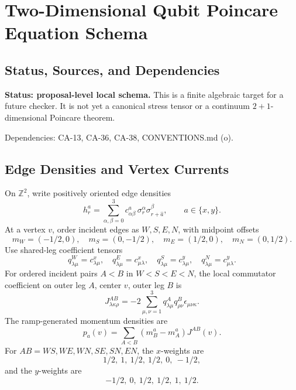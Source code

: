 
\section{Two-Dimensional Qubit Poincare Equation Schema}
\label{sec:qubit-2d-poincare-equation-schema}

\subsection{Status, Sources, and Dependencies}

\textbf{Status: proposal-level local schema.}  This is a finite algebraic
target for a future checker.  It is not yet a canonical stress tensor or a
continuum \(2+1\)-dimensional Poincare theorem.

Dependencies: CA-13, CA-36, CA-38, CONVENTIONS.md (o).


\subsection{Edge Densities and Vertex Currents}

On \(\mathbb Z^2\), write positively oriented edge densities
\[
  h^a_r=\sum_{\alpha,\beta=0}^3
  c^a_{\alpha\beta}\,
  \sigma_r^\alpha\sigma_{r+\hat a}^\beta,
  \qquad a\in\{x,y\}.
\]
At a vertex \(v\), order incident edges as \(W,S,E,N\), with midpoint offsets
\[
  m_W=(-1/2,0),\quad m_S=(0,-1/2),\quad
  m_E=(1/2,0),\quad m_N=(0,1/2).
\]
Use shared-leg coefficient tensors
\[
  q^W_{\lambda\mu}=c^x_{\lambda\mu},\quad
  q^E_{\lambda\mu}=c^x_{\mu\lambda},\quad
  q^S_{\lambda\mu}=c^y_{\lambda\mu},\quad
  q^N_{\lambda\mu}=c^y_{\mu\lambda}.
\]
For ordered incident pairs \(A<B\) in \(W<S<E<N\), the local commutator
coefficient on outer leg \(A\), center \(v\), outer leg \(B\) is
\[
  J^{AB}_{\lambda\kappa\rho}
  =
  -2\sum_{\mu,\nu=1}^3
  q^A_{\lambda\mu}q^B_{\rho\nu}\epsilon_{\mu\nu\kappa}.
  \tag{41.1}
\]
The ramp-generated momentum densities are
\[
  p_a(v)=\sum_{A<B}(m_B^a-m_A^a)J^{AB}(v).
  \tag{41.2}
\]
For \(AB=WS,WE,WN,SE,SN,EN\), the \(x\)-weights are
\[
  1/2,\ 1,\ 1/2,\ 1/2,\ 0,\ -1/2,
\]
and the \(y\)-weights are
\[
  -1/2,\ 0,\ 1/2,\ 1/2,\ 1,\ 1/2.
\]

